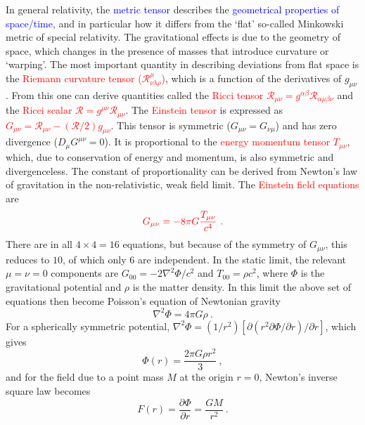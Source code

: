\documentclass[12pt,a4paper]{article}
\begin{document}
In general relativity, the \textcolor{blue}{metric tensor} describes the \textcolor{blue}{geometrical properties of space/time}, and in particular how it differs from the `flat' so-called Minkowski metric of special relativity. The gravitational effects is due to the geometry of space, which changes in the presence of masses that introduce curvature or `warping'. The most important quantity in describing deviations from flat space is the \textcolor{red}{Riemann curvature tensor ($\mathscr  R^\mu_{\nu \lambda \rho}$)}, which is a function of the derivatives of $g_{\mu \nu}$. From this one can derive quantities called the \textcolor{red}{Ricci tensor $\mathscr  R_{\mu \nu} = g^{\alpha \beta} \mathscr  R_{\alpha \mu \beta \nu}$} and the \textcolor{red}{Ricci scalar $\mathscr R = g^{\mu \nu}\mathscr R_{\mu \nu}$}. The \textcolor{red}{Einstein tensor} is expressed as \textcolor{red}{$G_{\mu\nu} = \mathscr R_{\mu\nu}-(\mathscr R/2) g_{\mu\nu}$}. This tensor is symmetric ($G_{\mu\nu} = G_{\nu\mu}$) and has zero divergence ($D_{\mu} G^{\mu \nu} = 0$). It is proportional to the \textcolor{red}{energy momentum tensor $T_{\mu\nu}$}, which, due to conservation of energy and momentum, is also symmetric and divergenceless. The constant of proportionality can be derived from Newton's law of gravitation in the non-relativistic, weak field limit. The \textcolor{red}{Einstein field equations} are
\begin{equation}
\color{red} G_{\mu\nu} = -8\pi G \dfrac{T_{\mu\nu}}{c^4} ~.
\end{equation}
There are in all $4\times 4 = 16$ equations, but because of the symmetry of $G_{\mu\nu}$, this reduces to $10$, of which only $6$ are independent. In the static limit, the relevant $\mu = \nu = 0$ components are $G_{00} = -2\nabla^2 \Phi /c^2$ and $T_{00} = \rho c^2$, where $\Phi$ is the gravitational potential and $\rho$ is the matter density. In this limit the above set of equations then become Poisson's equation of Newtonian gravity
\begin{equation}
\nabla^2 \Phi = 4\pi G \rho ~.
\end{equation}
For a spherically symmetric potential, $\nabla^2 \Phi = (1/r^2)[\partial (r^2 \partial \Phi/\partial r) /\partial r]$, which gives 
\begin{equation}
\Phi(r) =\dfrac{2\pi G\rho r^2}{3} ~,
\end{equation}
and for the field due to a point mass $M$ at the origin $r = 0$, Newton's inverse square law becomes
\begin{equation}
F(r) = \dfrac{\partial \Phi}{\partial r} = \dfrac{GM}{r^2} ~.
\end{equation}
\end{document}
